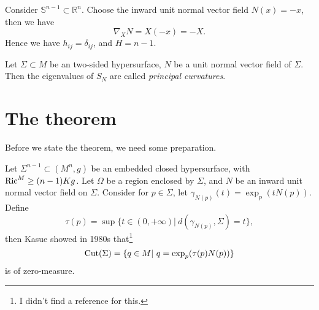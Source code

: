 \begin{eg}
    Consider $\mathbb{S}^{n-1}\subset\mathbb{R}^n$.
    Choose the inward unit normal vector field $N(x)=-x$, then we have
    \[\nabla_XN=X(-x)=-X.\]
    Hence we have $h_{ij}=\delta_{ij}$, and $H=n-1$.
\end{eg}

\begin{defn}
    Let $\Sigma\subset M$ be an two-sided hypersurface, $N$ be a unit normal vector field of $\Sigma$.
    Then the eigenvalues of $S_N$ are called \emph{principal curvatures}.
\end{defn}

\section{The theorem}

Before we state the theorem, we need some preparation.

Let $\Sigma^{n-1}\subset(M^n,g)$ be an embedded closed hypersurface, with $\operatorname{Ric}^M\geq(n-1)Kg$.
Let $\Omega$ be a region enclosed by $\Sigma$, and $N$ be an inward unit normal vector field on $\Sigma$.
Consider for $p\in\Sigma$, let $\gamma_{N(p)}(t)=\exp_p(tN(p))$.
Define
\[\tau(p)=\sup\{t\in(0,+\infty)|\ d(\gamma_{N(p)},\Sigma)=t\},\]
then Kasue showed in 1980s that\footnote{I didn't find a reference for this.}
\[\Cut(\Sigma)=\{q\in M|\ q=\exp_p(\tau(p)N(p))\}\]
is of zero-measure.

